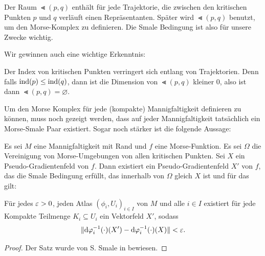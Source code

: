 Der Raum $\Lt (p, q)$ enthält für jede Trajektorie, die zwischen den kritischen Punkten $p$ und $q$ 
verläuft einen Repräsentanten. Später wird $\Lt (p, q)$ benutzt, um den Morse-Komplex zu definieren.
Die Smale Bedingung ist also für unsere Zwecke wichtig.

Wir gewinnen auch eine wichtige Erkenntnis: 

\begin{corollary}
    Der Index von kritischen Punkten verringert sich entlang von Trajektorien. Denn falls 
    ${ \operatorname{ind} } (p) \leq { \operatorname{ind} } (q)$, dann ist die Dimension von $\Lt (p, q)$
    kleiner $0$, also ist dann $\Lt (p, q) = \varnothing$.
\end{corollary}

Um den Morse Komplex für jede (kompakte) Mannigfaltigkeit definieren zu können, muss noch gezeigt
werden, dass auf jeder Mannigfaltigkeit tatsächlich ein Morse-Smale Paar existiert. 
Sogar noch stärker ist die folgende Aussage:

\begin{theorem}
    Es sei $M$ eine Mannigfaltigkeit mit Rand und $f$ eine Morse-Funktion. Es sei $\Omega$ die 
    Vereinigung von Morse-Umgebungen von allen kritischen Punkten. Sei $X$ ein Pseudo-Gradientenfeld 
    von $f$. Dann existiert ein Pseudo-Gradientenfeld $X'$ von $f$, das die Smale Bedingung erfüllt, 
    das innerhalb von $\Omega$ gleich $X$ ist und für das gilt:

    Für jedes $\varepsilon > 0$, jeden Atlas $(\phi_i, U_i)_{i \in I}$ von $M$ und alle $i \in I$ existiert 
    für jede Kompakte Teilmenge $K_i \subseteq U_i$ ein Vektorfeld $X'$, sodass 
    \[ \| { \operatorname{d} } \varphi_i^{-1} (\cdot) (X') - { \operatorname{d} } \varphi_i^{-1} (\cdot) (X) \| < \varepsilon . \]
\end{theorem}

\begin{proof}
    Der Satz wurde von S. Smale in \cite{smale1} bewiesen.
\end{proof}